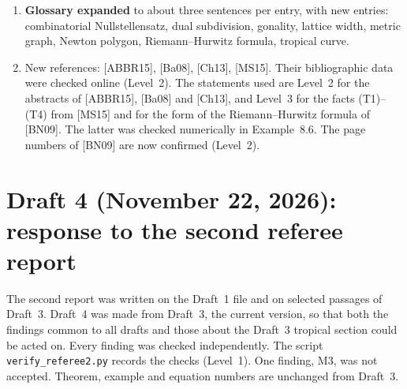 \documentclass[12pt,letterpaper]{article}
\begin{document}
\begin{enumerate}[leftmargin=*]
8.4 changed accordingly.
\item \textbf{Glossary expanded} to about three sentences per entry, with new
entries: combinatorial Nullstellensatz, dual subdivision, gonality, lattice
width, metric graph, Newton polygon, Riemann--Hurwitz formula, tropical curve.
\item New references: [ABBR15], [Ba08], [Ch13], [MS15]. Their bibliographic
data were checked online (Level~2). The statements used are Level~2 for the
abstracts of [ABBR15], [Ba08] and [Ch13], and Level~3 for the facts (T1)--(T4)
from [MS15] and for the form of the Riemann--Hurwitz formula of [BN09]. The
latter was checked numerically in Example~8.6. The page numbers of [BN09] are
now confirmed (Level~2).
\end{enumerate}

\section{Draft 4 (November 22, 2026): response to the second referee report}\label{sec:draft4}

The second report was written on the Draft~1 file and on selected passages
of Draft~3. Draft~4 was made from Draft~3, the current version, so that both
the findings common to all drafts and those about the Draft~3 tropical
section could be acted on. Every finding was checked independently. The
script \texttt{verify\_referee2.py} records the checks (Level~1). One finding,
M3, was not accepted. Theorem, example and equation numbers are unchanged
from Draft~3.
\end{document}
